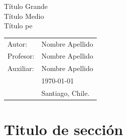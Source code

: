 \documentclass[11pt,letterpaper]{article}
\begin{document}
\newpage
\pagestyle{fancy}
\fancyhf{}
\vspace*{6cm}
\begin{center}
\Huge  {Título Grande}\\
\vspace{1cm}
\huge {Título Medio}\\
\vspace{1cm}
\small {Título pe} \\
\end{center}
\vfill
\begin{flushright}
\begin{tabular}{ll}
Autor: & Nombre Apellido\\
Profesor: & Nombre Apellido\\
Auxiliar: & Nombre Apellido\\
& \today\\
& Santiago, Chile.
\end{tabular}
\end{flushright}

\newpage
\pagestyle{fancy}
\fancyhf{}

\fancyhead[R]{\small \rm \textbf{\thepage}} %



\renewcommand{\sectionmark}[1]{\markright{\thesection.\ #1}}
\renewcommand{\headrulewidth}{0.5pt}
\renewcommand{\footrulewidth}{0.5pt}


\tableofcontents
\listoffigures

\newpage
\section{Titulo de sección}
\end{document}
